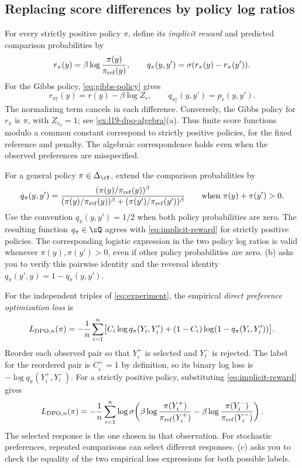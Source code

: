 \documentclass[11pt,twoside]{article}
\theoremstyle{definition}
\theoremstyle{remark}
\begin{document}
\subsection{Replacing score differences by policy log ratios}

For every strictly positive policy $\pi$, define its \emph{implicit reward}
and predicted comparison probabilities by
\begin{equation}
 r_\pi(y)=\beta\log\frac{\pi(y)}{\pi_{\rm ref}(y)},\qquad
 q_\pi(y,y')=\sigma(r_\pi(y)-r_\pi(y')).
 \label{eq:implicit-reward}
\end{equation}
For the Gibbs policy, \cref{eq:gibbs-policy} gives
\begin{equation}
 r_{\pi_r^\star}(y)=r(y)-\beta\log Z_r,
 \qquad q_{\pi_r^\star}(y,y')=p_r(y,y').
 \label{eq:inverse-gibbs}
\end{equation}
The normalizing term cancels in each difference. Conversely, the Gibbs
policy for $r_\pi$ is $\pi$, with $Z_{r_\pi}=1$; see
\cref{ex:l19-dpo-algebra}(a). Thus finite score functions modulo a common constant
correspond to strictly positive policies, for the fixed reference and penalty.
The algebraic correspondence holds even when the observed preferences are
misspecified.

For a general policy $\pi\in\Delta_{\cY}$, extend the comparison
probabilities by
\[
 q_\pi(y,y')=
 \frac{(\pi(y)/\pi_{\rm ref}(y))^\beta}
 {(\pi(y)/\pi_{\rm ref}(y))^\beta+(\pi(y')/\pi_{\rm ref}(y'))^\beta}
 \qquad\text{when }\pi(y)+\pi(y')>0.
\]
Use the convention $q_\pi(y,y')=1/2$ when both policy probabilities are
zero. The resulting function $q_\pi\in\cQ$ agrees with
\cref{eq:implicit-reward} for strictly positive policies. The corresponding
logistic expression in the two policy log ratios is valid whenever
$\pi(y),\pi(y')>0$, even if other policy probabilities are zero.
(b) asks you to verify this pairwise identity
and the reversal identity $q_\pi(y',y)=1-q_\pi(y,y')$.

For the independent triples of \cref{eq:experiment}, the empirical
\emph{direct preference optimization loss} is
\begin{equation}
 L_{{\rm DPO},n}(\pi)
 =-\frac1n\sum_{i=1}^n\bigl[
 C_i\log q_\pi(Y_i,Y_i')+(1-C_i)\log(1-q_\pi(Y_i,Y_i'))\bigr].
 \label{eq:empirical-dpo}
\end{equation}
Reorder each observed pair so that $Y_i^+$ is selected and $Y_i^-$ is
rejected. The label for the reordered pair is $C_i^+=1$ by definition,
so its binary log loss is $-\log q_\pi(Y_i^+,Y_i^-)$. For a strictly
positive policy, substituting \cref{eq:implicit-reward} gives
\begin{equation}
 L_{{\rm DPO},n}(\pi)
 =-\frac1n\sum_{i=1}^n\log\sigma\!\left(
 \beta\log\frac{\pi(Y_i^+)}{\pi_{\rm ref}(Y_i^+)}
 -\beta\log\frac{\pi(Y_i^-)}{\pi_{\rm ref}(Y_i^-)}\right).
 \label{eq:winner-dpo}
\end{equation}
The selected response is the one chosen in that observation. For stochastic
preferences, repeated comparisons can select different responses.
(c) asks you to check the equality of the two
empirical loss expressions for both possible labels.
\end{document}
